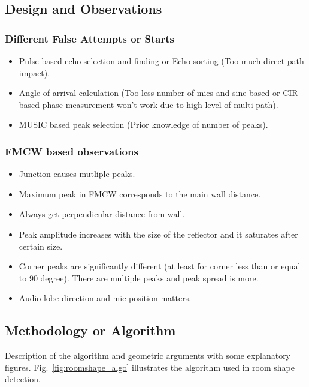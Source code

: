 \subsection{Design and Observations}

\subsubsection{Different False Attempts or Starts}
\begin{itemize}
\item Pulse based echo selection and finding or Echo-sorting (Too much direct path impact).
\item Angle-of-arrival calculation (Too less number of mics and sine based or CIR based phase measurement won't work due to high level of multi-path).
\item MUSIC based peak selection (Prior knowledge of number of peaks).
\end{itemize}

\subsubsection{FMCW based observations}
\begin{itemize}
\item Junction causes mutliple peaks.
\item Maximum peak in FMCW corresponds to the main wall distance.
\item Always get perpendicular distance from wall.
\item Peak amplitude increases with the size of the reflector and it saturates after certain size.
\item Corner peaks are significantly different (at least for corner less than or equal to 90 degree). There are multiple peaks and peak spread is more.
\item Audio lobe direction and mic position matters.
\end{itemize}

\subsection{Methodology or Algorithm}
Description of the algorithm and geometric arguments with some explanatory figures. Fig.~\ref{fig:roomshape_algo} illustrates the algorithm used in room shape detection.

